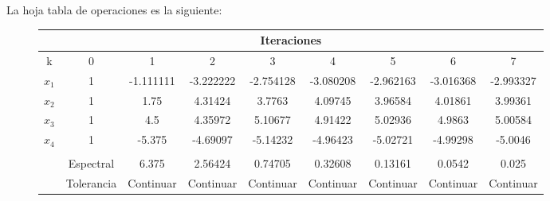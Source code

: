 \documentclass{article}
\begin{document}
La hoja tabla de operaciones es la siguiente:
\begin{figure}[h]
   \centering
   \begin{adjustwidth}{-2cm}{0cm}
       \begin{tabular}{| c | c | c | c | c | c | c | c | c |}
           \hline
           \multicolumn{9}{|c|}{Iteraciones} \\
           \hline
           k   &   0   &   1   &   2   &   3   &   4   &   5   &   6   &   7   \\
           \hline
           $x_1$   &   1   &   -1.111111   &   -3.222222   &   -2.754128   &   -3.080208   &   -2.962163   &   -3.016368   &   -2.993327   \\
           $x_2$   &   1   &   1.75   &   4.31424   &   3.7763   &   4.09745   &   3.96584   &   4.01861   &   3.99361   \\
           $x_3$   &   1   &   4.5   &   4.35972   &   5.10677   &   4.91422   &   5.02936   &   4.9863   &   5.00584   \\
           $x_4$   &   1   &   -5.375   &   -4.69097   &   -5.14232   &   -4.96423   &   -5.02721   &   -4.99298   &   -5.0046   \\
           \hline
           &   &   &   &   &   &   &   &   \\  %
           \hline
           &   Espectral   &   6.375   &   2.56424   &   0.74705   &   0.32608   &   0.13161   &   0.0542   &   0.025   \\
           \hline
           &   Tolerancia   &   Continuar   &   Continuar   &   Continuar   &   Continuar   &   Continuar   &   Continuar   &   Continuar   \\
           \hline
       \end{tabular}
   \end{adjustwidth}
\end{figure}
\end{document}
